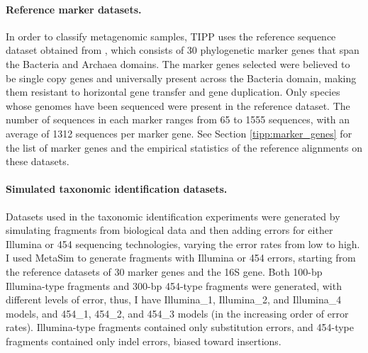 \paragraph{\bf Reference marker datasets. }
In order to classify metagenomic samples, 
TIPP uses the reference 
sequence dataset obtained from \cite{Liu2011d,Liu2011},
which consists of  30 phylogenetic marker genes that span the Bacteria and Archaea domains.  
The marker genes selected were believed to be single 
copy genes and universally present across the Bacteria domain, 
making them resistant to horizontal gene transfer 
and gene duplication.  
Only species whose genomes have been sequenced were 
present in the reference dataset.  The number of 
sequences in each marker ranges from 65 to 1555 sequences, 
with an average of 1312 sequences per marker gene.  
See Section \ref{tipp:marker_genes} 
for the list of marker genes and 
the empirical statistics of the reference
alignments on these datasets. 


\paragraph{\bf Simulated taxonomic identification datasets. }
Datasets used in the taxonomic identification experiments were generated by 
simulating fragments from biological data and then adding errors 
for either Illumina or 454 sequencing technologies, varying the error rates from low to high.  I used MetaSim \cite{Richter2008} to generate fragments with Illumina or 454 errors, starting from the reference datasets of
 30 marker genes and the 16S gene.  Both 100-bp Illumina-type fragments and 
300-bp 454-type fragments were generated, with different levels of error, thus, I have Illumina\_1, Illumina\_2, and Illumina\_4 models, and
454\_1, 454\_2, and 454\_3 models (in the increasing order of error rates).
Illumina-type fragments contained only substitution errors,
and  454-type fragments contained only indel errors, 
biased toward insertions.  

